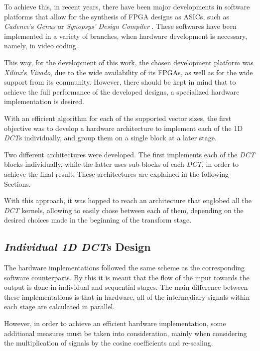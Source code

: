 To achieve this, in recent years, there have been major developments in software platforms that allow for the synthesis of FPGA designs as ASICs, such as \emph{Cadence}'s \emph{Genus} or \emph{Synopsys' Design Compiler} \cite{GenusSynthesisSolution, DesignCompilerGraphical}. These softwares have been implemented in a variety of branches, when hardware development is necessary, namely, in video coding. 

This way, for the development of this work, the chosen development platform was \emph{Xilinx}'s \emph{Vivado}, due to the wide availability of its FPGAs, as well as for the wide support from its community. However, there should be kept in mind that to achieve the full performance of the developed designs, a specialized hardware implementation is desired. 

With an efficient algorithm for each of the supported vector sizes, the first objective was to develop a hardware architecture to implement each of the 1D \emph{DCT}s individually, and group them on a single block at a later stage. 

Two different architectures were developed. The first implements each of the \emph{DCT} blocks individually, while the latter uses sub-blocks of each \emph{DCT}, in order to achieve the final result. These architectures are explained in the following Sections.

With this approach, it was hopped to reach an architecture that englobed all the \emph{DCT} kernels, allowing to easily chose between each of them, depending on the desired choices made in the beginning of the transform stage.

\subsection{\emph{Individual 1D DCTs} Design}

The hardware implementations followed the same scheme as the corresponding software counterparts. By this it is meant that the flow of the input towards the output is done in individual and sequential stages. The main difference between these implementations is that in hardware, all of the intermediary signals within each stage are calculated in parallel. 

However, in order to achieve an efficient hardware implementation, some additional measures must be taken into consideration, mainly when considering the multiplication of signals by the cosine coefficients and re-scaling.


